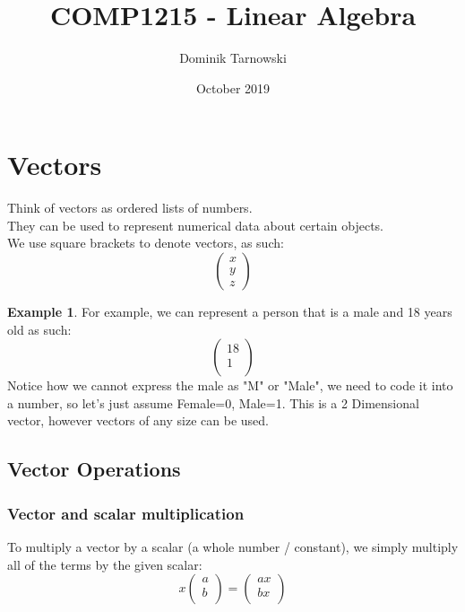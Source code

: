 \documentclass[table]{article}
\theoremstyle{definition}
\newtheorem{ex}{Example}[section]
\begin{document}
  \title{COMP1215 - Linear Algebra}
  \author{Dominik Tarnowski}
  \date{October 2019}
  \maketitle

  \tableofcontents

  \section{Vectors}
  Think of vectors as ordered lists of numbers. \\
  They can be used to represent numerical data about certain objects. \\
  We use square brackets to denote vectors, as such:
  \begin{equation}
    \begin{pmatrix}
      x \\
      y \\
      z
    \end{pmatrix}
  \end{equation}
  
  \begin{ex}
    For example, we can represent a person that is a male and 18 years old as such: \\
    \begin{equation}
      \begin{pmatrix}
        18 \\
        1 \\
      \end{pmatrix}
    \end{equation}
    Notice how we cannot express the male as "M" or "Male", we need to code it into a number, so let's just assume Female=0, Male=1. This is a 2 Dimensional vector, however vectors of any size can be used.
  \end{ex}
  
    \subsection{Vector Operations}
    \subsubsection{Vector and scalar multiplication}
    To multiply a vector by a scalar (a whole number / constant), we simply multiply all of the terms by the given scalar:
    \begin{equation}
      x \begin{pmatrix}
        a \\
        b \\
      \end{pmatrix}
      = \begin{pmatrix}
        ax \\
        bx \\
      \end{pmatrix}
    \end{equation}
\end{document}
